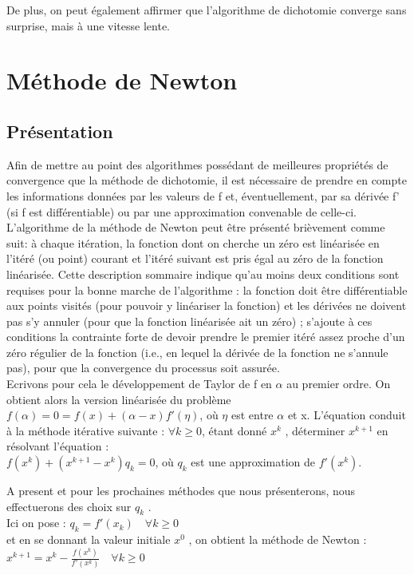 \documentclass{article}
\begin{document}
De plus, on peut également affirmer que l'algorithme de dichotomie converge sans surprise, mais à une vitesse lente. 
\section{Méthode de Newton}
\subsection{Présentation} 
\quad Afin de mettre au point des algorithmes possédant de meilleures propriétés de convergence que la méthode de dichotomie, il est nécessaire de prendre en
compte les informations données par les valeurs de f et, éventuellement, par sa dérivée f' (si f est différentiable) ou par une approximation convenable de celle-ci.\\
 L'algorithme de la méthode de Newton peut être présenté brièvement comme suit: à chaque itération, la fonction dont on cherche un zéro est linéarisée en l'itéré (ou point) courant et l'itéré suivant est pris égal au zéro de la fonction linéarisée. Cette description sommaire indique qu'au moins deux conditions sont requises pour la bonne marche de l'algorithme : la fonction doit être différentiable aux points visités (pour pouvoir y linéariser la fonction) et les dérivées ne doivent pas s'y annuler (pour que la fonction linéarisée ait un zéro) ; s'ajoute à ces conditions la contrainte forte de devoir prendre le premier itéré assez proche d'un zéro régulier de la fonction (i.e., en lequel la dérivée de la fonction ne s'annule pas), pour que la convergence du processus soit assurée. \\


Ecrivons pour cela le développement de Taylor de f en $\alpha$  au premier ordre.
On obtient alors la version linéarisée du problème
$f(\alpha) = 0 = f(x) + (\alpha - x)f'(\eta)$,
où $\eta$ est entre $\alpha$ et x. L’équation  conduit à la méthode itérative suivante :
$\forall k \geq 0$, étant donné $x^k$ , déterminer $x^{k+1}$ en résolvant l’équation : \\ 
$ f(x^k) + (x^{k+1}-x^k)q_k = 0$, où $q_k$ est une approximation de $f'(x^k)$.

\quadd A present et pour les prochaines méthodes que nous présenterons, nous effectuerons des choix sur $q_k$ . \\
\quadd Ici on pose : \quad $q_k=f'(x_k)  \quad \forall k\geq 0$ \\ et en se donnant la valeur initiale $x^0$ , on obtient la méthode de Newton : \\
    \quadd $x^{k+1} = x^k - \frac{f(x^k)}{f'(x^k)} \quad \forall k\geq 0$ \\
\end{document}
